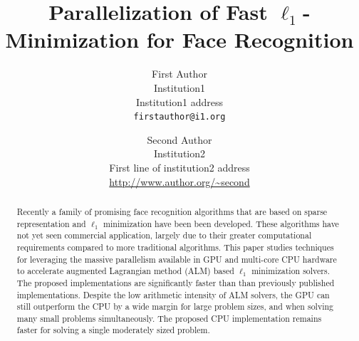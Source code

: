 \documentclass[10pt,twocolumn,letterpaper]{article}
\begin{document}
\title{Parallelization of Fast $\ell_1$-Minimization for Face Recognition}

\author{First Author\\
Institution1\\
Institution1 address\\
{\tt\small firstauthor@i1.org}
\and
Second Author\\
Institution2\\
First line of institution2 address\\
{\small\url{http://www.author.org/~second}}
}

\maketitle

\begin{abstract} 
Recently a family of promising face recognition algorithms that are based on sparse representation and $\ell_1$ minimization have been been developed.  These algorithms have not yet seen commercial application, largely due to their greater computational requirements compared to more traditional algorithms.  This paper studies techniques for leveraging the massive parallelism available in GPU and multi-core CPU hardware to accelerate augmented Lagrangian method (ALM) based $\ell_1$ minimization solvers.  The proposed implementations are significantly faster than than previously published implementations.  Despite the low arithmetic intensity of ALM solvers, the GPU can still outperform the CPU by a wide margin for large problem sizes, and when solving many small problems simultaneously.  The proposed CPU implementation remains faster for solving a single moderately sized problem.  
\end{abstract}
\end{document}
